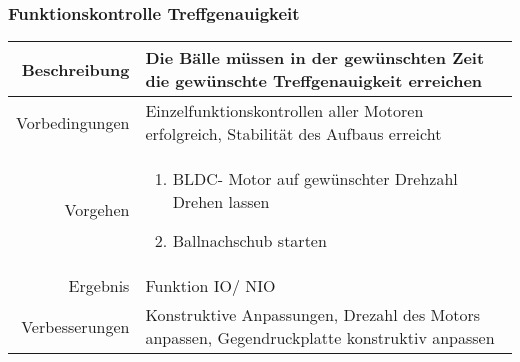 \subsubsection{Funktionskontrolle Treffgenauigkeit }
\begin{table}[h!]
	\renewcommand{\arraystretch}{1.5}
	\begin{tabular}{|r|p{14cm}|}
		\hline Beschreibung & Die Bälle müssen in der gewünschten Zeit die gewünschte Treffgenauigkeit erreichen   \\ 
		\hline Vorbedingungen & Einzelfunktionskontrollen aller Motoren erfolgreich, Stabilität des Aufbaus erreicht \\ 
		\hline Vorgehen & 
		\begin{enumerate}
			\item BLDC- Motor auf gewünschter Drehzahl Drehen lassen 
			\item Ballnachschub starten 
		\end{enumerate} \\ 
		\hline Ergebnis & Funktion IO/ NIO \\ 
		\hline Verbesserungen & Konstruktive Anpassungen, Drezahl des Motors anpassen, Gegendruckplatte konstruktiv anpassen \\ 
		\hline 
	\end{tabular}
\end{table}